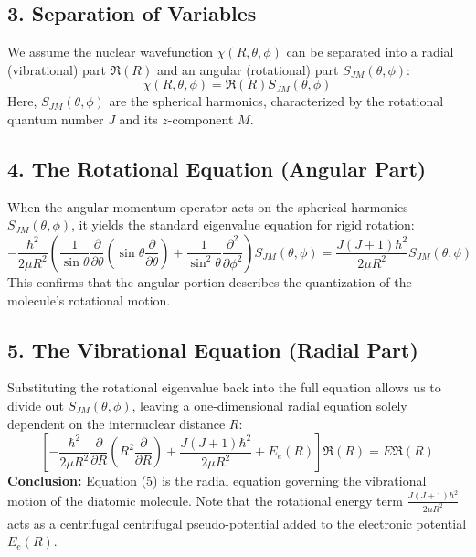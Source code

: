 \documentclass{book}
\begin{document}
\subsection*{3. Separation of Variables}
We assume the nuclear wavefunction $\chi(R, \theta, \phi)$ can be separated into a radial (vibrational) part $\Re(R)$ and an angular (rotational) part $S_{JM}(\theta, \phi)$:
\begin{equation}
    \chi(R, \theta, \phi) = \Re(R) S_{JM}(\theta, \phi)
\end{equation}
Here, $S_{JM}(\theta, \phi)$ are the spherical harmonics, characterized by the rotational quantum number $J$ and its $z$-component $M$.

\subsection*{4. The Rotational Equation (Angular Part)}
When the angular momentum operator acts on the spherical harmonics $S_{JM}(\theta, \phi)$, it yields the standard eigenvalue equation for rigid rotation:
\begin{equation}
    -\frac{\hbar^2}{2\mu R^2} \left( \frac{1}{\sin\theta} \frac{\partial}{\partial \theta} \left( \sin\theta \frac{\partial}{\partial \theta} \right) + \frac{1}{\sin^2\theta} \frac{\partial^2}{\partial \phi^2} \right) S_{JM}(\theta, \phi) = \frac{J(J+1)\hbar^2}{2\mu R^2} S_{JM}(\theta, \phi)
\end{equation}
This confirms that the angular portion describes the quantization of the molecule's rotational motion.

\subsection*{5. The Vibrational Equation (Radial Part)}
Substituting the rotational eigenvalue back into the full equation allows us to divide out $S_{JM}(\theta, \phi)$, leaving a one-dimensional radial equation solely dependent on the internuclear distance $R$:
\begin{equation}
    \left[ -\frac{\hbar^2}{2\mu R^2} \frac{\partial}{\partial R} \left( R^2 \frac{\partial}{\partial R} \right) + \frac{J(J+1)\hbar^2}{2\mu R^2} + E_e(R) \right] \Re(R) = E \Re(R)
\end{equation}
\textbf{Conclusion:} Equation (5) is the radial equation governing the vibrational motion of the diatomic molecule. Note that the rotational energy term $\frac{J(J+1)\hbar^2}{2\mu R^2}$ acts as a centrifugal centrifugal pseudo-potential added to the electronic potential $E_e(R)$.
\end{document}
